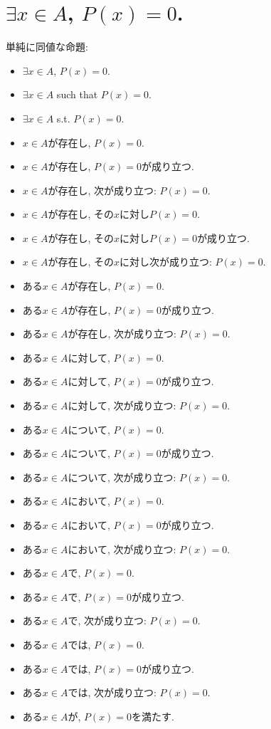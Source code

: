 \documentclass[a4paper,12pt,draft]{amsart}
\begin{document}
\section{$\exists x \in A$, $P(x)=0$.}
単純に同値な命題:
\begin{itemize}
\item $\exists x \in A$, $P(x)=0$.
\item $\exists x \in A$ such that $P(x)=0$.
\item $\exists x \in A$ s.t. $P(x)=0$.
\item $x\in A$が存在し, $P(x)=0$.
\item $x\in A$が存在し, $P(x)=0$が成り立つ.
\item $x\in A$が存在し, 次が成り立つ: $P(x)=0$.
\item $x\in A$が存在し, その$x$に対し$P(x)=0$.
\item $x\in A$が存在し, その$x$に対し$P(x)=0$が成り立つ.
\item $x\in A$が存在し, その$x$に対し次が成り立つ: $P(x)=0$.
\item ある$x\in A$が存在し, $P(x)=0$.
\item ある$x\in A$が存在し, $P(x)=0$が成り立つ.
\item ある$x\in A$が存在し, 次が成り立つ: $P(x)=0$.
\item ある$x\in A$に対して, $P(x)=0$.
\item ある$x\in A$に対して, $P(x)=0$が成り立つ.
\item ある$x\in A$に対して, 次が成り立つ: $P(x)=0$.
\item ある$x\in A$について, $P(x)=0$.
\item ある$x\in A$について, $P(x)=0$が成り立つ.
\item ある$x\in A$について, 次が成り立つ: $P(x)=0$.
\item ある$x\in A$において, $P(x)=0$.
\item ある$x\in A$において, $P(x)=0$が成り立つ.
\item ある$x\in A$において, 次が成り立つ: $P(x)=0$.
\item ある$x\in A$で, $P(x)=0$.
\item ある$x\in A$で, $P(x)=0$が成り立つ.
\item ある$x\in A$で, 次が成り立つ: $P(x)=0$.
\item ある$x\in A$では, $P(x)=0$.
\item ある$x\in A$では, $P(x)=0$が成り立つ.
\item ある$x\in A$では, 次が成り立つ: $P(x)=0$.
\item ある$x\in A$が, $P(x)=0$を満たす.

\end{itemize}
\end{document}
